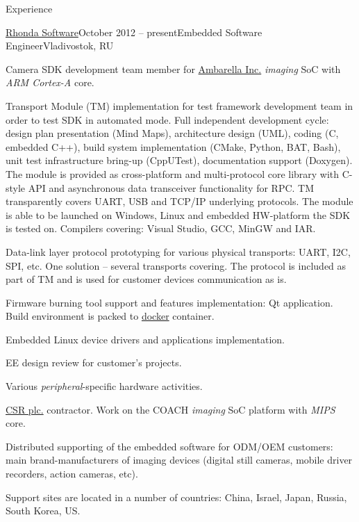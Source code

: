\documentclass{template}
\begin{document}
\begin{rSection}{Experience}
\begin{rCompany}{\href{http://www.rhondasoftware.com}{Rhonda Software}}{October 2012 -- present}{Embedded Software Engineer}{Vladivostok, RU}

\item Camera SDK development team member for \href{http://www.ambarella.com}{Ambarella Inc.} \textit{imaging} SoC with \textit{ARM Cortex-A} core.
\item Transport Module (TM) implementation for test framework development team in order to test SDK in automated mode. Full independent development
      cycle: design plan presentation (Mind Maps), architecture design (UML), coding (C, embedded C++), build system implementation (CMake, Python,
      BAT, Bash), unit test infrastructure bring-up (CppUTest), documentation support (Doxygen). The module is provided as cross-platform and
      multi-protocol core library with C-style API and asynchronous data transceiver functionality for RPC. TM transparently covers UART, USB and
      TCP/IP underlying protocols. The module is able to be launched on Windows, Linux and embedded HW-platform the SDK is tested on. Compilers
      covering: Visual Studio, GCC, MinGW and IAR.
\item Data-link layer protocol prototyping for various physical transports: UART, I2C, SPI, etc. One solution -- several transports covering.
      The protocol is included as part of TM and is used for customer devices communication as is.
\item Firmware burning tool support and features implementation: Qt application. Build environment is packed to \href{www.docker.com}{docker}
      container.
\item Embedded Linux device drivers and applications implementation.
\item EE design review for customer's projects.
\item Various \textit{peripheral}-specific hardware activities. \newline
\item \href{http://www.csr.com}{CSR plc.} contractor. Work on the COACH \textit{imaging} SoC platform with \textit{MIPS} core.
\item Distributed supporting of the embedded software for ODM/OEM customers: main brand-manufacturers of imaging devices (digital still cameras,
      mobile driver recorders, action cameras, etc).
\item Support sites are located in a number of countries: China, Israel, Japan, Russia, South Korea, US.

\end{rCompany}
\end{rSection}
\end{document}
